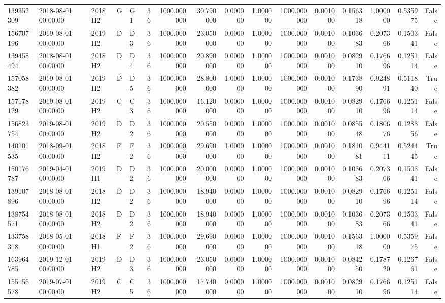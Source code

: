 \begin{tabular}{lllllrrrrrrrrrrr}
139352309 & 2018-08-01 00:00:00 & 2018H2 & G & G1 & 36 & 1000.000000 & 30.790000 & 0.000000 & 1.000000 & 1000.000000 & 0.001000 & 0.156318 & 1.000000 & 0.535975 & False \\
156707196 & 2019-08-01 00:00:00 & 2019H2 & D & D3 & 36 & 1000.000000 & 23.050000 & 0.000000 & 1.000000 & 1000.000000 & 0.001000 & 0.103683 & 0.207366 & 0.150341 & False \\
139458494 & 2018-08-01 00:00:00 & 2018H2 & D & D4 & 36 & 1000.000000 & 20.890000 & 0.000000 & 1.000000 & 1000.000000 & 0.001000 & 0.082910 & 0.176696 & 0.125114 & False \\
157058382 & 2019-08-01 00:00:00 & 2019H2 & D & D5 & 36 & 1000.000000 & 28.800000 & 1.000000 & 1.000000 & 1000.000000 & 0.001000 & 0.173890 & 0.924891 & 0.511840 & True \\
157178129 & 2019-08-01 00:00:00 & 2019H2 & C & C3 & 36 & 1000.000000 & 16.120000 & 0.000000 & 1.000000 & 1000.000000 & 0.001000 & 0.082910 & 0.176696 & 0.125114 & False \\
156823754 & 2019-08-01 00:00:00 & 2019H2 & D & D2 & 36 & 1000.000000 & 20.550000 & 0.000000 & 1.000000 & 1000.000000 & 0.001000 & 0.085548 & 0.180676 & 0.128356 & False \\
140101535 & 2018-09-01 00:00:00 & 2018H2 & F & F2 & 36 & 1000.000000 & 29.690000 & 1.000000 & 1.000000 & 1000.000000 & 0.001000 & 0.181081 & 0.944111 & 0.524445 & True \\
150176787 & 2019-04-01 00:00:00 & 2019H1 & D & D2 & 36 & 1000.000000 & 20.000000 & 0.000000 & 1.000000 & 1000.000000 & 0.001000 & 0.103683 & 0.207366 & 0.150341 & False \\
139107896 & 2018-08-01 00:00:00 & 2018H2 & D & D2 & 36 & 1000.000000 & 18.940000 & 0.000000 & 1.000000 & 1000.000000 & 0.001000 & 0.082910 & 0.176696 & 0.125114 & False \\
138754571 & 2018-08-01 00:00:00 & 2018H2 & D & D2 & 36 & 1000.000000 & 18.940000 & 0.000000 & 1.000000 & 1000.000000 & 0.001000 & 0.103683 & 0.207366 & 0.150341 & False \\
133758318 & 2018-05-01 00:00:00 & 2018H1 & F & F2 & 36 & 1000.000000 & 29.690000 & 0.000000 & 1.000000 & 1000.000000 & 0.001000 & 0.156318 & 1.000000 & 0.535975 & False \\
163964785 & 2019-12-01 00:00:00 & 2019H2 & D & D3 & 36 & 1000.000000 & 23.050000 & 0.000000 & 1.000000 & 1000.000000 & 0.001000 & 0.084250 & 0.178720 & 0.126761 & False \\
155156578 & 2019-07-01 00:00:00 & 2019H2 & C & C5 & 36 & 1000.000000 & 17.740000 & 0.000000 & 1.000000 & 1000.000000 & 0.001000 & 0.082910 & 0.176696 & 0.125114 & False \\

\end{tabular}
